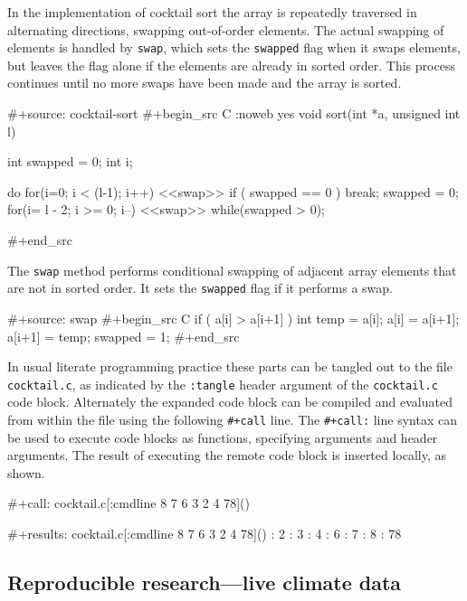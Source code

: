 \documentclass[article,shortnames]{jss}
\begin{document}
In the implementation of cocktail sort the array is repeatedly
traversed in alternating directions, swapping out-of-order elements.
The actual swapping of elements is handled by \texttt{swap}, which sets the
\texttt{swapped} flag when it swaps elements, but leaves the flag alone if
the elements are already in sorted order.  This process continues
until no more swaps have been made and the array is sorted.


\begin{Code}
#+source: cocktail-sort
#+begin_src C :noweb yes
  void sort(int *a, unsigned int l)
  {
    int swapped = 0;
    int i;

    do {
      for(i=0; i < (l-1); i++) {
        <<swap>>
      }
      if ( swapped == 0 ) break;
      swapped = 0;
      for(i= l - 2; i >= 0; i--) {
        <<swap>>
      }
    } while(swapped > 0);
  }
#+end_src
\end{Code}






The \texttt{swap} method performs conditional swapping of adjacent array
elements that are not in sorted order.  It sets the \texttt{swapped} flag if
it performs a swap.


\begin{Code}
#+source: swap
#+begin_src C
  if ( a[i] > a[i+1] ) {
    int temp = a[i];
    a[i] = a[i+1];
    a[i+1] = temp;
    swapped = 1;
  }
#+end_src
\end{Code}






In usual literate programming practice these parts can be tangled out
to the file \texttt{cocktail.c}, as indicated by the \texttt{:tangle} header
argument of the \texttt{cocktail.c} code block.  Alternately the expanded
code block can be compiled and evaluated from within the  file
using the following \texttt{\#+call} line.  The \texttt{\#+call:} line syntax can be
used to execute code blocks as functions, specifying arguments and
header arguments.  The result of executing the remote code block is
inserted locally, as shown.


\begin{Code}
#+call: cocktail.c[:cmdline 8 7 6 3 2 4 78]()

#+results: cocktail.c[:cmdline 8 7 6 3 2 4 78]()
: 2
: 3
: 4
: 6
: 7
: 8
: 78
\end{Code}
\subsection{Reproducible research---live climate data}
\label{sec-4-3}
\end{document}

